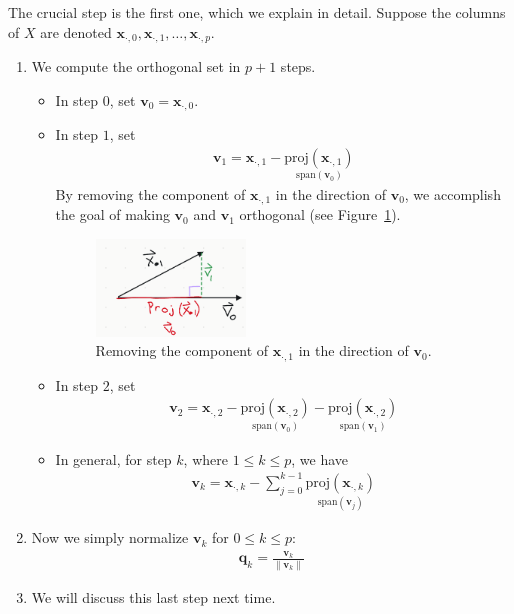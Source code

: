 \documentclass[12pt, a4paper]{article}
\theoremstyle{definition}
\begin{document}
	The crucial step is the first one, which we explain in detail. Suppose the columns of
	$X$ are denoted $\mathbf{x}_{\cdot, 0},\mathbf{x}_{\cdot, 1},\ldots,\mathbf{x}_{\cdot, p}$.
	\begin{enumerate}[label=(\roman*)]
		\item We compute the orthogonal set in $p+1$ steps.
		\begin{itemize}
			\item  In step $0$, set
			$\mathbf{v}_{0}=\mathbf{x}_{\cdot, 0}$.
			\item In step $1$, set
			\begin{align*}
				\mathbf{v}_1=\mathbf{x}_{\cdot, 1}
				-\underset{\text{span}(\mathbf{v}_{0})}{\text{proj}(\mathbf{x}_{\cdot,1})}
			\end{align*}
			By removing the component of $\mathbf{x}_{\cdot, 1}$ in the direction of $\mathbf{v}_0$,
			we accomplish the goal of making $\mathbf{v}_0$ and $\mathbf{v}_1$ orthogonal
			(see Figure~\ref{fig:vec-proj-1d}).
			\begin{figure}
				\centering
				\includegraphics[width=0.4\textwidth]{vector-projection-1d}
				\caption{Removing the component of $\mathbf{x}_{\cdot, 1}$ in the
				direction of $\mathbf{v}_0$.}
				\label{fig:vec-proj-1d}
			\end{figure}
			\item In step $2$, set
			\begin{align*}
				\mathbf{v}_2=\mathbf{x}_{\cdot, 2}
				-\underset{\text{span}(\mathbf{v}_{0})}{\text{proj}(\mathbf{x}_{\cdot,2})}
				-\underset{\text{span}(\mathbf{v}_{1})}{\text{proj}(\mathbf{x}_{\cdot,2})}
			\end{align*}
			\item In general, for step $k$, where $1\leq k\leq p$, we have
			\begin{align*}
				\mathbf{v}_k=\mathbf{x}_{\cdot, k}
				-\sum_{j=0}^{k-1}\underset{\text{span}(\mathbf{v}_{j})}{\text{proj}(\mathbf{x}_{\cdot,k})}
			\end{align*}
		\end{itemize}
		\item Now we simply normalize $\mathbf{v}_k$ for $0\leq k\leq p$:
		\begin{align*}
			\mathbf{q}_k=\frac{\mathbf{v}_k}{\|\mathbf{v}_k\|}
		\end{align*}
		\item We will discuss this last step next time.
	\end{enumerate}
	
	\pagebreak
	\printbibliography
\end{document}
